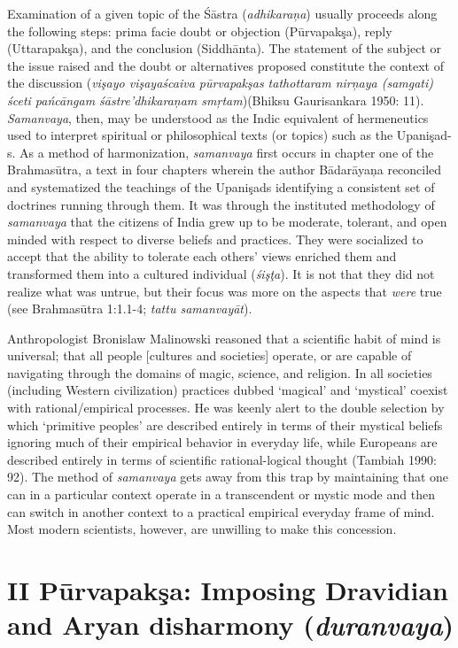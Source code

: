 Examination of a given topic of the Śāstra (\textit{adhikaraņa}) usually proceeds along the following steps: prima facie doubt or objection (Pūrvapakşa), reply (Uttarapakşa), and the conclusion (Siddhānta). The statement of the subject or the issue raised and the doubt or alternatives proposed constitute the context of the discussion (\textit{vişayo vişayaścaiva pūrvapakşas tathottaram nirņaya (samgati) śceti pańcāngam śāstre’dhikaraņam smŗtam})(Bhiksu Gaurisankara 1950: 11). \textit{Samanvaya}, then, may be understood as the Indic equivalent of hermeneutics used to interpret spiritual or philosophical texts (or topics) such as the Upanişad-s. As a method of harmonization, \textit{samanvaya} first occurs in chapter one of the Brahmasūtra, a text in four chapters wherein the author Bādarāyaņa reconciled and systematized the teachings of the Upanişads identifying a consistent set of doctrines running through them. It was through the instituted methodology of \textit{samanvaya} that the citizens of India grew up to be moderate, tolerant, and open minded with respect to diverse beliefs and practices. They were socialized to accept that the ability to tolerate each others' views enriched them and transformed them into a cultured individual (\textit{śişţa}). It is not that they did not realize what was untrue, but their focus was more on the aspects that \textit{were} true (see Brahmasūtra 1:1.1-4; \textit{tattu samanvayāt}).

Anthropologist Bronislaw Malinowski reasoned that a scientific habit of mind is universal; that all people [cultures and societies] operate, or are capable of navigating through the domains of magic, science, and religion. In all societies (including Western civilization) practices dubbed ‘magical’ and ‘mystical’ coexist with rational/empirical processes. He was keenly alert to the double selection by which ‘primitive peoples’ are described entirely in terms of their mystical beliefs ignoring much of their empirical behavior in everyday life, while Europeans are described entirely in terms of scientific rational-logical thought (Tambiah 1990: 92). The method of \textit{samanvaya} gets away from this trap by maintaining that one can in a particular context operate in a transcendent or mystic mode and then can switch in another context to a practical empirical everyday frame of mind. Most modern scientists, however, are unwilling to make this concession.


\section*{II Pūrvapakşa: Imposing Dravidian and Aryan disharmony (\textit{duranvaya})}

